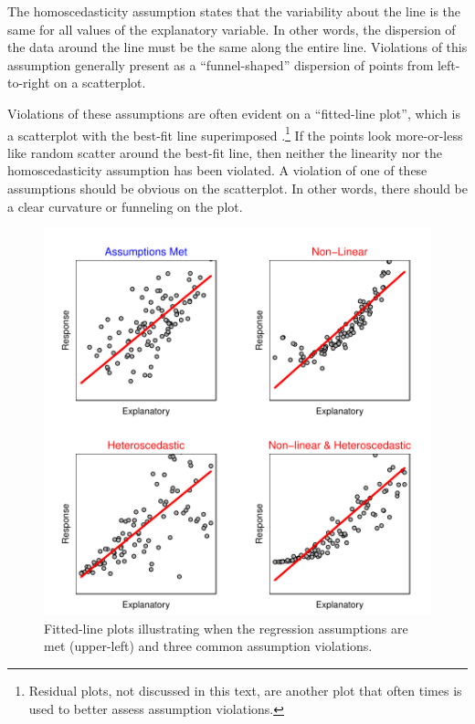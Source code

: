 \documentclass[10pt,openany]{book}\usepackage[]{graphicx}\usepackage[]{color}
\newenvironment{knitrout}{}{} %
\begin{document}
The homoscedasticity assumption states that the variability about the line is the same for all values of the explanatory variable. In other words, the dispersion of the data around the line must be the same along the entire line. Violations of this assumption generally present as a ``funnel-shaped'' dispersion of points from left-to-right on a scatterplot.

Violations of these assumptions are often evident on a ``fitted-line plot'', which is a scatterplot with the best-fit line superimposed .\footnote{Residual plots, not discussed in this text, are another plot that often times is used to better assess assumption violations.} If the points look more-or-less like random scatter around the best-fit line, then neither the linearity nor the homoscedasticity assumption has been violated. A violation of one of these assumptions should be obvious on the scatterplot. In other words, there should be a clear curvature or funneling on the plot.

\begin{knitrout}
\color{fgcolor}\begin{figure}[hbtp]

{\centering \includegraphics[width=.75\linewidth]{Figs/ResidPlotEx-1} 

}

\caption[Fitted-line plots illustrating when the regression assumptions are met (upper-left) and three common assumption violations]{Fitted-line plots illustrating when the regression assumptions are met (upper-left) and three common assumption violations.}\label{fig:ResidPlotEx}
\end{figure}


\end{knitrout}
\end{document}
